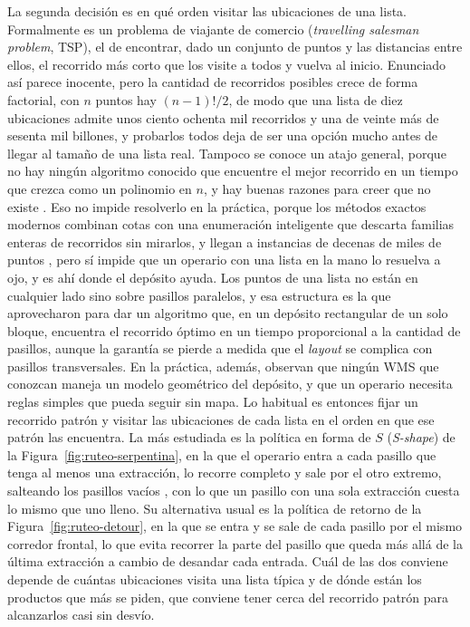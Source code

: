 La segunda decisión es en qué orden visitar las ubicaciones de una lista.
Formalmente es un problema de viajante de comercio (\emph{travelling salesman problem}, TSP), el de encontrar, dado un conjunto de puntos y las distancias entre ellos, el recorrido más corto que los visite a todos y vuelva al inicio.
Enunciado así parece inocente, pero la cantidad de recorridos posibles crece de forma factorial, con $n$ puntos hay $(n-1)!/2$, de modo que una lista de diez ubicaciones admite unos ciento ochenta mil recorridos y una de veinte más de sesenta mil billones, y probarlos todos deja de ser una opción mucho antes de llegar al tamaño de una lista real.
Tampoco se conoce un atajo general, porque no hay ningún algoritmo conocido que encuentre el mejor recorrido en un tiempo que crezca como un polinomio en $n$, y hay buenas razones para creer que no existe \citep{karp1972reducibility}.
Eso no impide resolverlo en la práctica, porque los métodos exactos modernos combinan cotas con una enumeración inteligente que descarta familias enteras de recorridos sin mirarlos, y llegan a instancias de decenas de miles de puntos \citep{applegate2006tsp}, pero sí impide que un operario con una lista en la mano lo resuelva a ojo, y es ahí donde el depósito ayuda.
Los puntos de una lista no están en cualquier lado sino sobre pasillos paralelos, y esa estructura es la que aprovecharon \citet{ratliff1983order} para dar un algoritmo que, en un depósito rectangular de un solo bloque, encuentra el recorrido óptimo en un tiempo proporcional a la cantidad de pasillos, aunque la garantía se pierde a medida que el \emph{layout} se complica con pasillos transversales.
En la práctica, además, \citet[capítulo~10]{bartholdi2014warehouse} observan que ningún WMS que conozcan maneja un modelo geométrico del depósito, y que un operario necesita reglas simples que pueda seguir sin mapa.
Lo habitual es entonces fijar un recorrido patrón y visitar las ubicaciones de cada lista en el orden en que ese patrón las encuentra.
La más estudiada es la política en forma de $S$ (\emph{S-shape}) de la Figura~\ref{fig:ruteo-serpentina}, en la que el operario entra a cada pasillo que tenga al menos una extracción, lo recorre completo y sale por el otro extremo, salteando los pasillos vacíos \citep{dekoster2007design}, con lo que un pasillo con una sola extracción cuesta lo mismo que uno lleno.
Su alternativa usual es la política de retorno de la Figura~\ref{fig:ruteo-detour}, en la que se entra y se sale de cada pasillo por el mismo corredor frontal, lo que evita recorrer la parte del pasillo que queda más allá de la última extracción a cambio de desandar cada entrada.
Cuál de las dos conviene depende de cuántas ubicaciones visita una lista típica y de dónde están los productos que más se piden, que conviene tener cerca del recorrido patrón para alcanzarlos casi sin desvío.

